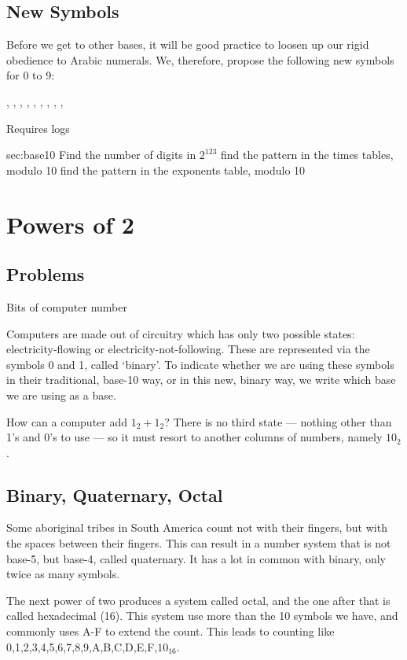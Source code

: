 \subsection{New Symbols}
Before we get to other bases, it will be good practice to loosen up our rigid obedience to Arabic 
numerals.  We, therefore, propose the following new symbols for 0 to 9:

\0, \1, \2, \3, \4, \5, \6, \7, \8, \9

\ExSection[Exercises]
Requires logs
\begin{exercises}{sec:base10}
\prob{}Find the number of digits in $2^{123}$
\prob{}find the pattern in the times tables, modulo 10
\prob{}find the pattern in the exponents table, modulo 10
\end{exercises}

\newpage
\section{Powers of 2}
\subsection{Problems}
Bits of computer number
\newpage

Computers are made out of circuitry which has only two possible states: electricity-flowing or
electricity-not-following.  These are represented via the symbols 0 and 1, called `binary'.  
To indicate whether we are using these symbols in their traditional, base-10 way, or in 
this new, binary way, we write which base we are using as a base.

How can a computer add $1_2+1_2$?  There is no third state --- nothing other than 1's and 0's
to use --- so it must resort to another columns of numbers, namely $10_2$.  

\subsection{Binary, Quaternary, Octal }
Some aboriginal tribes in South America count not with their fingers, but with the spaces between
their fingers.  This can result in a number system that is not base-5, but base-4, called quaternary.
It has a lot in common with binary, only twice as many symbols.

The next power of two produces a system called octal, and the one after that is called hexadecimal
(16).  This system use more than the 10 symbols we have, and commonly uses A-F to extend the
count.  This leads to counting like 0,1,2,3,4,5,6,7,8,9,A,B,C,D,E,F,$10_{16}$.

